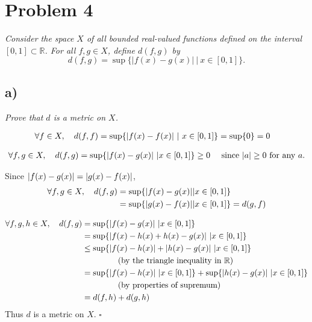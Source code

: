\documentclass[12pt]{article}
\begin{document}
\section*{Problem 4}
{\it Consider the space $X$ of all bounded real-valued functions defined on the interval $[0,1] \subset \mathbb{R}$.  For all $f,g \in X$, define $d(f,g)$ by}
\begin{equation}
	\label{problem_4_definition}
	d(f, g) = \sup\{|f(x) - g(x)|\ |\ x \in [0,1]\}.
\end{equation}

\subsection*{ a)}
{\it Prove that $d$ is a metric on $X$.}

\begin{align*}
  \forall f \in X,\ \ \ d(f,f) &= \sup\{\abs{f(x) - f(x)}\ |\ x \in [0,1]\} = \sup\{0\} = 0
\end{align*}

\begin{align*}
  \forall f,g \in X,\ \ \ d(f,g) = \sup\{\abs{f(x) - g(x)}\ | x \in [0,1]\} \geq 0\ \ \ \ \text{since $\abs{a} \geq 0$ for any $a$.}
\end{align*}

Since $\abs{f(x) - g(x)} = \abs{g(x) - f(x)}$,
\begin{align*}
  \forall f,g \in X,\ \ \ d(f,g) &= \sup\{\abs{f(x) - g(x)} | x \in [0,1]\} \\
  &= \sup\{\abs{g(x) - f(x)} | x \in [0,1]\}  = d(g,f)
\end{align*}

\begin{align*}
  \forall f,g,h \in X,\ \ \ d(f,g) &= \sup\{\abs{f(x) - g(x)}\ | x \in [0,1]\} \\
  &= \sup\{\abs{f(x) - h(x) + h(x) - g(x)}\ | x \in [0,1]\} \\
  &\leq \sup\{\abs{f(x) - h(x)} + \abs{h(x) - g(x)}\ | x \in [0,1]\} \\
  &\hphantom{mmmmm} \text{(by the triangle inequality in $\mathbb{R}$)}\\
  &= \sup\{\abs{f(x) - h(x)}\ | x \in [0,1]\} + \sup\{\abs{h(x) - g(x)}\ | x \in [0,1]\} \\
  &\hphantom{mmmmm} \text{(by properties of supremum)} \\
  &= d(f, h) + d(g, h)
\end{align*}
Thus $d$ is a metric on $X$. \hfill $\square$
\end{document}
